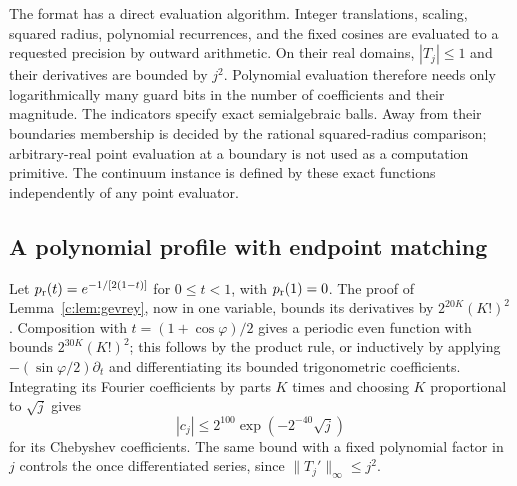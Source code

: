 The format has a direct evaluation algorithm. Integer translations,
scaling, squared radius, polynomial recurrences, and the fixed cosines
are evaluated to a requested precision by outward arithmetic. On
their real domains, $|T_j|\le1$ and their derivatives are bounded
by $j^2$. Polynomial evaluation therefore needs only logarithmically
many guard bits in the number of coefficients and their magnitude.
The indicators specify exact semialgebraic balls. Away from their
boundaries membership is decided by the rational squared-radius
comparison; arbitrary-real point evaluation at a boundary is not
used as a computation primitive. The continuum instance is defined
by these exact functions independently of any point evaluator.

\subsection{A polynomial profile with endpoint matching}
Let $p_{\rm r}(t)=e^{-1/[2(1-t)]}$ for $0\le t<1$, with $p_{\rm r}(1)=0$.
The proof of Lemma~\ref{c:lem:gevrey}, now in one variable, bounds
its derivatives by $2^{20K}(K!)^2$. Composition with
$t=(1+\cos\varphi)/2$ gives a periodic even function with bounds
$2^{30K}(K!)^2$; this follows by the product rule, or inductively
by applying $-(\sin\varphi/2)\partial_t$ and differentiating its
bounded trigonometric coefficients. Integrating its Fourier
coefficients by parts $K$ times and choosing $K$ proportional to
$\sqrt j$ gives
\begin{equation}
 |c_j|\le 2^{100}\exp(-2^{-40}\sqrt j)
                                                               \label{c:eq:chebtail}
\end{equation}
for its Chebyshev coefficients. The same bound with a fixed
polynomial factor in $j$ controls the once differentiated series,
since $\|T_j'\|_\infty\le j^2$.

